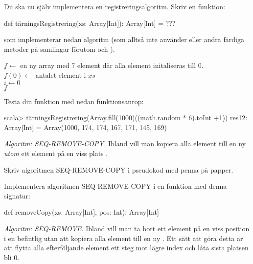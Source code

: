 \Subtask Du ska nu själv implementera en registreringsalgoritm. Skriv en funktion:
\begin{Code}
def tärningsRegistrering(xs: Array[Int]): Array[Int] = ???
\end{Code}
som implementerar nedan algoritm (som alltså inte använder  eller andra färdiga metoder på samlingar förutom  och ).

\begin{algorithm}[H]
 
 $f \leftarrow$ en ny array med $7$ element där alla element initaliseras till 0.\\
 $f(0) \leftarrow$ antalet element i $xs$ \\
 $i \leftarrow 0$  \\
 \Return $f$ 
\end{algorithm}

Testa din funktion med nedan funktionsanrop:
\begin{REPL}
scala> tärningsRegistrering(Array.fill(1000)((math.random * 6).toInt +1))
res12: Array[Int] = Array(1000, 174, 174, 167, 171, 145, 169)
\end{REPL}

\Task \emph{Algoritm: SEQ-REMOVE-COPY.} Ibland vill man kopiera alla element till en ny  \emph{utom} ett element på en viss plats .   

\Subtask\Pen Skriv algoritmen SEQ-REMOVE-COPY i pseudokod med penna på papper.

\Subtask Implementera algoritmen SEQ-REMOVE-COPY i en funktion med denna signatur:
\begin{Code}
def removeCopy(xs: Array[Int], pos: Int): Array[Int]
\end{Code}

\Task \emph{Algoritm: SEQ-REMOVE.} Ibland vill man ta bort ett element på en viss position i en befintlig  utan att kopiera alla element till en ny . Ett sätt att göra detta är att flytta alla efterföljande element ett steg mot lägre index och låta sista platsen bli 0.   

